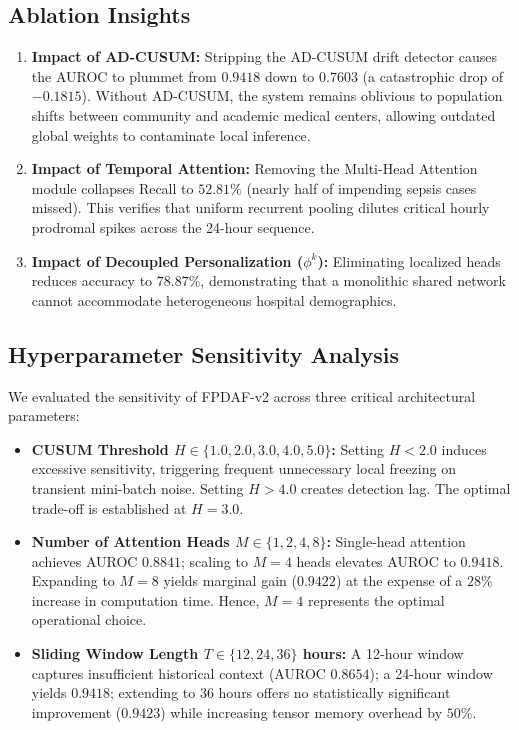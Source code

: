 \documentclass[journal,twocolumn,10pt]{IEEEtran}
\begin{document}
\subsection{Ablation Insights}
\begin{enumerate}
    \item \textbf{Impact of AD-CUSUM:} Stripping the AD-CUSUM drift detector causes the AUROC to plummet from $0.9418$ down to $0.7603$ (a catastrophic drop of $-0.1815$). Without AD-CUSUM, the system remains oblivious to population shifts between community and academic medical centers, allowing outdated global weights to contaminate local inference.
    \item \textbf{Impact of Temporal Attention:} Removing the Multi-Head Attention module collapses Recall to $52.81\%$ (nearly half of impending sepsis cases missed). This verifies that uniform recurrent pooling dilutes critical hourly prodromal spikes across the 24-hour sequence.
    \item \textbf{Impact of Decoupled Personalization ($\phi^k$):} Eliminating localized heads reduces accuracy to $78.87\%$, demonstrating that a monolithic shared network cannot accommodate heterogeneous hospital demographics.
\end{enumerate}

\subsection{Hyperparameter Sensitivity Analysis}
We evaluated the sensitivity of FPDAF-v2 across three critical architectural parameters:
\begin{itemize}
    \item \textbf{CUSUM Threshold $H \in \{1.0, 2.0, 3.0, 4.0, 5.0\}$:} Setting $H < 2.0$ induces excessive sensitivity, triggering frequent unnecessary local freezing on transient mini-batch noise. Setting $H > 4.0$ creates detection lag. The optimal trade-off is established at $H = 3.0$.
    \item \textbf{Number of Attention Heads $M \in \{1, 2, 4, 8\}$:} Single-head attention achieves AUROC $0.8841$; scaling to $M=4$ heads elevates AUROC to $0.9418$. Expanding to $M=8$ yields marginal gain ($0.9422$) at the expense of a $28\%$ increase in computation time. Hence, $M=4$ represents the optimal operational choice.
    \item \textbf{Sliding Window Length $T \in \{12, 24, 36\}$ hours:} A 12-hour window captures insufficient historical context (AUROC $0.8654$); a 24-hour window yields $0.9418$; extending to 36 hours offers no statistically significant improvement ($0.9423$) while increasing tensor memory overhead by $50\%$.
\end{itemize}
\end{document}
